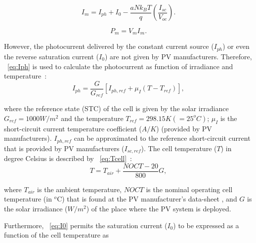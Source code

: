 \documentclass[review]{elsarticle}
\begin{document}
\begin{equation}
\label{eq:Imfinal}
I_{m} = I_{ph} + I_{0} - \dfrac{aNk_{B}T}{q} \left( \dfrac{I_{sc}}{V_{oc}} \right).  
\end{equation}

\begin{equation}
\label{eq:Pm}
P_{m} = V_{m} I_{m}.
\end{equation}

%
However, the photocurrent delivered by the constant current source ($I_{ph}$) or even the reverse saturation current ($ I_{0} $) are not given by PV manufacturers. Therefore, ~\eqref{eq:Iph} is used to calculate the photocurrent as function of irradiance and temperature~\cite{Villalva}:
\begin{equation}
\label{eq:Iph}
I_{ph}=\dfrac{G}{G_{ref}} \left[ I_{ph,ref} + \mu_{I} \left( T-T_{ref} \right)    \right], 
\end{equation}

\noindent where the reference state (STC) of the cell is given by the solar irradiance $ G_{ref}=1000 W/m^{2} $ and the temperature $ T_{ref}=298.15 K (=25^{o}C) $; $ \mu_{I} $ is the short-circuit current temperature coefficient ($A/K$) %
(provided by PV manufacturers). $ I_{ph,ref} $ can be approximated to the reference short-circuit current \cite{Villalva} that is provided by PV manufacturers ($ I_{sc,ref} $).
The cell temperature ($ T $) in degree Celsius is described by ~\ref{eq:Tcell}~\cite{Ross}:
\begin{equation}
\label{eq:Tcell}
T = T_{air} + \dfrac{NOCT-20}{800}G,
\end{equation}

\noindent where $ T_{air} $ is the ambient temperature, $NOCT$ is the nominal operating cell temperature (in $^{o}$C) that is found at the PV manufacturer's data-sheet \cite{Ross}, and $G$ is the solar irradiance ($ W/m^{2} $) of the place where the PV system is deployed.

Furthermore, ~\eqref{eq:I0} permits the saturation current ($ I_{0} $) to be expressed as a function of the cell temperature as~\cite{Villalva} 
\end{document}
